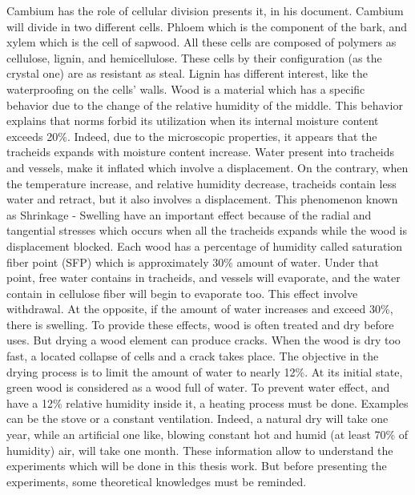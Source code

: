 Cambium has the role of cellular division \parencite{Reference4} presents it, in his document. Cambium will divide in two different cells. Phloem which is the component of the bark, and xylem which is the cell of sapwood.  All these cells are composed of polymers as cellulose, lignin, and hemicellulose. These cells by their configuration (as the crystal one) are as resistant as steal. Lignin has different interest, like the waterproofing on the cells’ walls. 
Wood is a material which has a specific behavior due to the change of the relative humidity of the middle. This behavior explains that norms forbid its utilization when its internal moisture content exceeds 20\%. Indeed, due to the microscopic properties, it appears that the tracheids expands with moisture content increase. Water present into tracheids and vessels, make it inflated which involve a displacement. On the contrary, when the temperature increase, and relative humidity decrease, tracheids contain less water and retract, but it also involves a displacement. This phenomenon known as Shrinkage - Swelling have an important effect because of the radial and tangential stresses which occurs when all the tracheids expands while the wood is displacement blocked. 
Each wood has a percentage of humidity called saturation fiber point (SFP) which is approximately 30\% amount of water. Under that point, free water contains in tracheids, and vessels will evaporate, and the water contain in cellulose fiber will begin to evaporate too. This effect involve withdrawal. At the opposite, if the amount of water increases and exceed 30\%, there is swelling. 
To provide these effects, wood is often treated and dry before uses. But drying a wood element can produce cracks. When the wood is dry too fast, a located collapse of cells and a crack takes place. The objective in the drying process is to limit the amount of water to nearly 12\%. At its initial state, green wood is considered as a wood full of water. To prevent water effect, and have a 12\% relative humidity inside it, a heating process must be done. Examples can be the stove or a constant ventilation. Indeed, a natural dry will take one year, while an artificial one like, blowing constant hot and humid (at least 70\% of humidity) air, will take one month. 
These information allow to understand the experiments which will be done in this thesis work. But before presenting the experiments, some theoretical knowledges must be reminded. 



